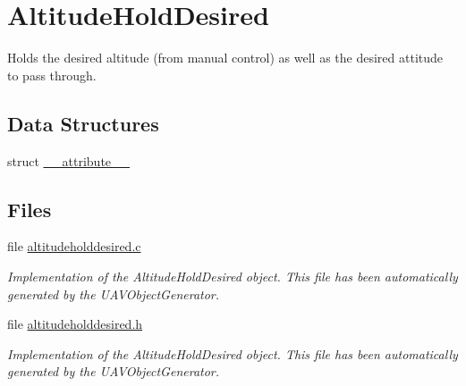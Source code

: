 \hypertarget{group___altitude_hold_desired}{\section{\-Altitude\-Hold\-Desired}
\label{group___altitude_hold_desired}
}


\-Holds the desired altitude (from manual control) as well as the desired attitude to pass through.  


\subsection*{\-Data \-Structures}
\begin{DoxyCompactItemize}
\item 
struct \hyperlink{struct____attribute____}{\-\_\-\-\_\-attribute\-\_\-\-\_\-}
\end{DoxyCompactItemize}
\subsection*{\-Files}
\begin{DoxyCompactItemize}
\item 
file \hyperlink{altitudeholddesired_8c}{altitudeholddesired.\-c}
\begin{DoxyCompactList}\small\item\em \-Implementation of the \-Altitude\-Hold\-Desired object. \-This file has been automatically generated by the \-U\-A\-V\-Object\-Generator. \end{DoxyCompactList}\item 
file \hyperlink{altitudeholddesired_8h}{altitudeholddesired.\-h}
\begin{DoxyCompactList}\small\item\em \-Implementation of the \-Altitude\-Hold\-Desired object. \-This file has been automatically generated by the \-U\-A\-V\-Object\-Generator. \end{DoxyCompactList}\end{DoxyCompactItemize}
